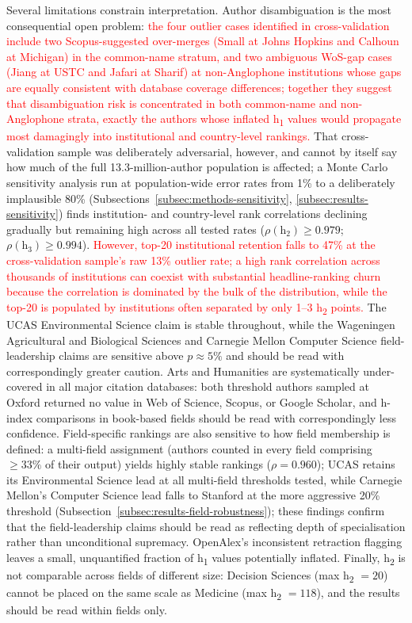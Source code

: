 Several limitations constrain interpretation. Author disambiguation is the most consequential open problem: \textcolor{red}{the four outlier cases identified in cross-validation include two Scopus-suggested over-merges (Small at Johns Hopkins and Calhoun at Michigan) in the common-name stratum, and two ambiguous WoS-gap cases (Jiang at USTC and Jafari at Sharif) at non-Anglophone institutions whose gaps are equally consistent with database coverage differences; together they suggest that disambiguation risk is concentrated in both common-name and non-Anglophone strata, exactly the authors whose inflated h\textsubscript{1} values would propagate most damagingly into institutional and country-level rankings.} That cross-validation sample was deliberately adversarial, however, and cannot by itself say how much of the full 13.3-million-author population is affected; a Monte Carlo sensitivity analysis run at population-wide error rates from 1\% to a deliberately implausible 80\% (Subsections~\ref{subsec:methods-sensitivity}, \ref{subsec:results-sensitivity}) finds institution- and country-level rank correlations declining gradually but remaining high across all tested rates ($\rho(\mathrm{h}_2) \geq 0.979$; $\rho(\mathrm{h}_3) \geq 0.994$). \textcolor{red}{However, top-20 institutional retention falls to 47\% at the cross-validation sample's raw 13\% outlier rate; a high rank correlation across thousands of institutions can coexist with substantial headline-ranking churn because the correlation is dominated by the bulk of the distribution, while the top-20 is populated by institutions often separated by only 1--3 h\textsubscript{2} points.} The UCAS Environmental Science claim is stable throughout, while the Wageningen Agricultural and Biological Sciences and Carnegie Mellon Computer Science field-leadership claims are sensitive above $p \approx 5\%$ and should be read with correspondingly greater caution. Arts and Humanities are systematically under-covered in all major citation databases: both threshold authors sampled at Oxford returned no value in Web of Science, Scopus, or Google Scholar, and h-index comparisons in book-based fields should be read with correspondingly less confidence. Field-specific rankings are also sensitive to how field membership is defined: a multi-field assignment (authors counted in every field comprising $\ge 33\%$ of their output) yields highly stable rankings ($\rho = 0.960$); UCAS retains its Environmental Science lead at all multi-field thresholds tested, while Carnegie Mellon's Computer Science lead falls to Stanford at the more aggressive 20\% threshold (Subsection~\ref{subsec:results-field-robustness}); these findings confirm that the field-leadership claims should be read as reflecting depth of specialisation rather than unconditional supremacy. OpenAlex's inconsistent retraction flagging leaves a small, unquantified fraction of h\textsubscript{1} values potentially inflated. Finally, h\textsubscript{2} is not comparable across fields of different size: Decision Sciences (max h\textsubscript{2} $= 20$) cannot be placed on the same scale as Medicine (max h\textsubscript{2} $= 118$), and the results should be read within fields only.

